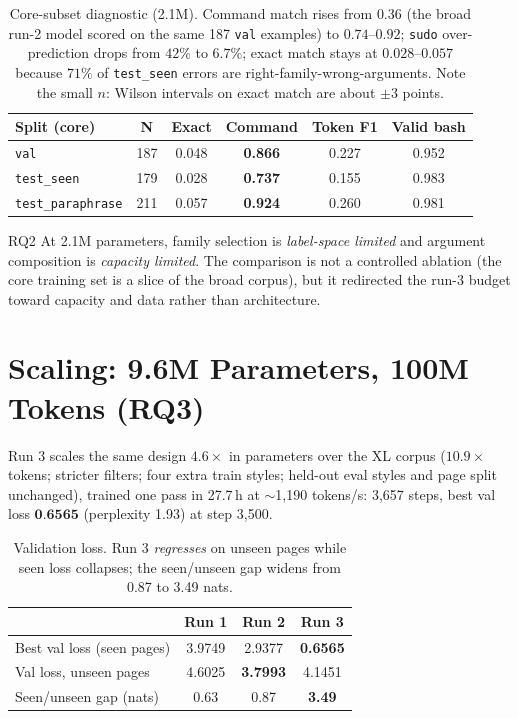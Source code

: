 \documentclass[11pt,a4paper]{article}
\newcommand{\best}[1]{\textbf{#1}}
\begin{document}
\begin{table}[t]
\centering\small
\begin{tabular}{lccccc}
\toprule
Split (core) & N & Exact & Command & Token F1 & Valid bash \\
\midrule
\texttt{val} & 187 & 0.048 & \best{0.866} & 0.227 & 0.952 \\
\texttt{test\_seen} & 179 & 0.028 & \best{0.737} & 0.155 & 0.983 \\
\texttt{test\_paraphrase} & 211 & 0.057 & \best{0.924} & 0.260 & 0.981 \\
\bottomrule
\end{tabular}
\caption{Core-subset diagnostic (2.1M). Command match rises from $0.36$ (the
broad run-2 model scored on the same 187 \texttt{val} examples) to
$0.74$--$0.92$; \texttt{sudo} over-prediction drops from $42\%$ to $6.7\%$;
exact match stays at $0.028$--$0.057$ because $71\%$ of \texttt{test\_seen}
errors are right-family-wrong-arguments. Note the small $n$: Wilson
intervals on exact match are about $\pm3$ points.}
\label{tab:core}
\end{table}

\begin{finding}{RQ2}
At 2.1M parameters, family selection is \emph{label-space limited} and
argument composition is \emph{capacity limited}. The comparison is not a
controlled ablation (the core training set is a slice of the broad corpus),
but it redirected the run-3 budget toward capacity and data rather than
architecture.
\end{finding}

\section{Scaling: 9.6M Parameters, 100M Tokens (RQ3)}
\label{sec:scaling}

Run 3 scales the same design $4.6\times$ in parameters over the XL corpus
($10.9\times$ tokens; stricter filters; four extra train styles; held-out eval
styles and page split unchanged), trained one pass in 27.7\,h at
$\sim$1{,}190 tokens/s: 3{,}657 steps, best val loss $\best{0.6565}$
(perplexity 1.93) at step 3{,}500.

\begin{table}[t]
\centering\small
\begin{tabular}{lccc}
\toprule
 & Run 1 & Run 2 & Run 3 \\
\midrule
Best val loss (seen pages) & 3.9749 & 2.9377 & \best{0.6565} \\
Val loss, unseen pages & 4.6025 & \best{3.7993} & 4.1451 \\
Seen/unseen gap (nats) & 0.63 & 0.87 & \textbf{3.49} \\
\bottomrule
\end{tabular}
\caption{Validation loss. Run 3 \emph{regresses} on unseen pages while seen
loss collapses; the seen/unseen gap widens from 0.87 to 3.49 nats.}
\label{tab:losses}
\end{table}
\end{document}
